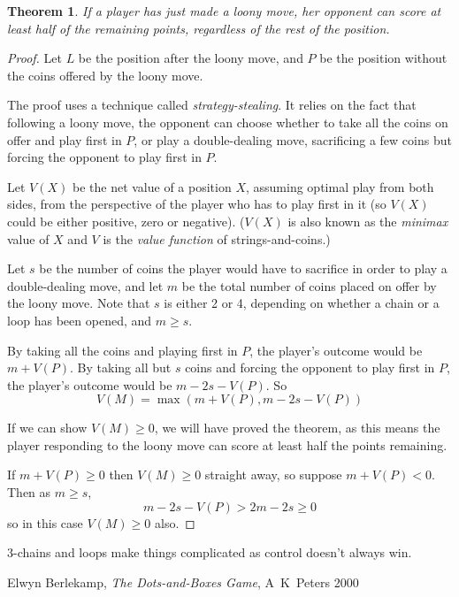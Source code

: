 \documentclass[a4paper,twocolumn]{article}
\begin{document}
\newtheorem{sstealing}{Theorem}

\begin{sstealing}
  If a player has just made a loony move, her opponent can score at
  least half of the remaining points, regardless of the rest of the
  position.
\end{sstealing}

\begin{proof}
  Let $L$ be the position after the loony move, and $P$ be the
  position without the coins offered by the loony move.
  
  The proof uses a technique called \emph{strategy-stealing}. It
  relies on the fact that following a loony move, the opponent can
  choose whether to take all the coins on offer and play first in $P$,
  or play a double-dealing move, sacrificing a few coins but forcing
  the opponent to play first in $P$.

  Let $V(X)$ be the net value of a position $X$, assuming optimal play
  from both sides, from the perspective of the player who has to play
  first in it (so $V(X)$ could be either positive, zero or
  negative). ($V(X)$ is also known as the \emph{minimax} value of
  $X$ and $V$ is the \emph{value function} of strings-and-coins.)

  Let $s$ be the number of coins the player would have to sacrifice in
  order to play a double-dealing move, and let $m$ be the total number
  of coins placed on offer by the loony move. Note that $s$ is either
  2 or 4, depending on whether a chain or a loop has been opened, and
  $m \ge s$.

  By taking all the coins and playing first in $P$, the player's
  outcome would be $m + V(P)$. By taking all but $s$ coins and forcing
  the opponent to play first in $P$, the player's outcome would be
  $m-2s-V(P)$. So $$V(M) = \max(m+V(P), m-2s-V(P))$$

  If we can show $V(M) \ge 0$, we will have proved the theorem, as
  this means the player responding to the loony move can score at
  least half the points remaining.

  If $m+V(P) \ge 0$ then $V(M) \ge 0$ straight away, so suppose
  $m+V(P) < 0$. Then as $m \ge s$, $$m-2s-V(P) > 2m-2s \ge 0$$ so in
  this case $V(M) \ge 0$ also.
\end{proof}

3-chains and loops make things complicated as control doesn't always win.

\begin{thebibliography}{99}
   Elwyn Berlekamp, \emph{The Dots-and-Boxes Game},
    A~K~Peters 2000
\end{thebibliography}
\end{document}
